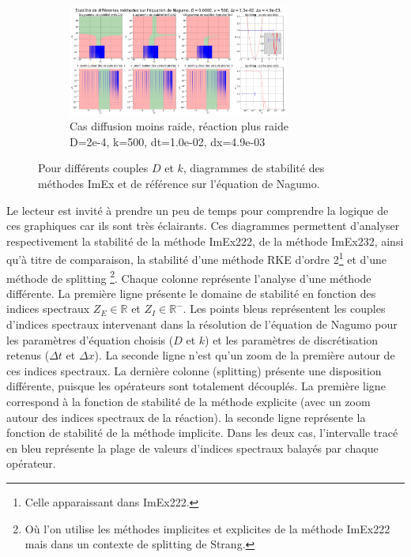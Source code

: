 \begin{figure}[htbp]
        \begin{subfigure}{\textwidth}
            \centering
            \includegraphics[width=0.8\textwidth]{media/4_travail/2_nagumo/stabilite/STABILITE_D0.0002_k500_dt1.0e-02_dx4.9e-03.png}
            \caption{Cas diffusion moins raide, réaction plus raide\\D=2e-4, k=500, dt=1.0e-02, dx=4.9e-03}
            \label{fig:stabilite_nagumo_c}
        \end{subfigure}
        
        \caption{Pour différents couples $D$ et $k$, diagrammes de stabilité des méthodes ImEx et de référence sur l'équation de Nagumo.}
        \label{fig:stabilite_nagumo}
    \end{figure}

        Le lecteur est invité à prendre un peu de temps pour comprendre la logique de ces graphiques car ils sont très éclairants. 
        Ces diagrammes permettent d'analyser respectivement la stabilité de la méthode ImEx222, de la méthode ImEx232, 
        ainsi qu'à titre de comparaison, la stabilité d'une méthode RKE d'ordre 2\footnote{Celle apparaissant dans ImEx222.} 
        et d'une méthode de splitting
        \footnote{Où l'on utilise les méthodes implicites et explicites de la méthode ImEx222 mais dans un contexte de splitting de Strang.}.
        Chaque colonne représente l'analyse d'une méthode différente.
        La première ligne présente le domaine de stabilité en fonction des indices spectraux $Z_E \in \mathbb{R}$ et $Z_I \in \mathbb{R}^-$. 
        Les points bleus représentent les couples d'indices spectraux intervenant dans la résolution de l'équation de Nagumo 
        pour les paramètres d'équation choisis ($D$ et $k$) et les paramètres de discrétisation retenus ($\Delta t$ et $\Delta x$). 
        La seconde ligne n'est qu'un zoom de la première autour de ces indices spectraux. 
        La dernière colonne (splitting) présente une disposition différente, puisque les opérateurs sont totalement découplés.
        La première ligne correspond à la fonction de stabilité de la méthode explicite (avec un zoom autour des indices spectraux de la réaction).
        la seconde ligne représente la fonction de stabilité de la méthode implicite. 
        Dans les deux cas, l'intervalle tracé en bleu représente la plage de valeurs d'indices spectraux balayés par chaque opérateur.


